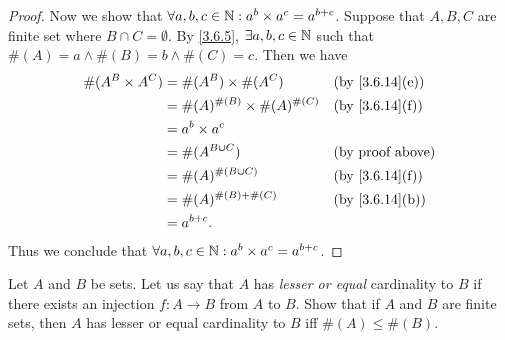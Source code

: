 \begin{proof}
	Now we show that \(\forall a, b, c \in \mathbb{N} : a^b \times a^c = a^{b + c}\).
	Suppose that \(A, B, C\) are finite set where \(B \cap C = \emptyset\).
	By \cref{3.6.5}, \(\exists a, b, c \in \mathbb{N}\) such that \(\#(A) = a \land \#(B) = b \land \#(C) = c\).
	Then we have
	\begin{align*}
		\#(A^B \times A^C) & = \#(A^B) \times \#(A^C)             &  & \text{(by \cref{3.6.14}(e))} \\
		                   & = \#(A)^{\#(B)} \times \#(A)^{\#(C)} &  & \text{(by \cref{3.6.14}(f))} \\
		                   & = a^b \times a^c                                                       \\
		                   & = \#(A^{B \cup C})                   &  & \text{(by proof above)}      \\
		                   & = \#(A)^{\#(B \cup C)}               &  & \text{(by \cref{3.6.14}(f))} \\
		                   & = \#(A)^{\#(B) + \#(C)}              &  & \text{(by \cref{3.6.14}(b))} \\
		                   & = a^{b + c}.
	\end{align*}
	Thus we conclude that \(\forall a, b, c \in \mathbb{N} : a^b \times a^c = a^{b + c}\).
\end{proof}

\begin{ex}\label{ex:3.6.7}
	Let \(A\) and \(B\) be sets.
	Let us say that \(A\) has \emph{lesser or equal} cardinality to \(B\) if there exists an injection \(f : A \to B\) from \(A\) to \(B\).
	Show that if \(A\) and \(B\) are finite sets, then \(A\) has lesser or equal cardinality to \(B\) iff \(\#(A) \leq \#(B)\).
\end{ex}


